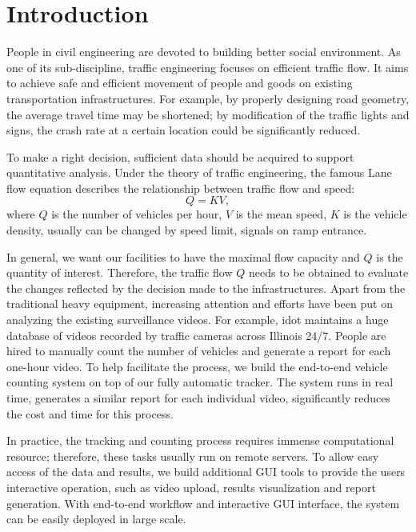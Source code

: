 \section{Introduction}
\label{sec:sys-intro}

People in civil engineering are devoted to building better social environment.
As one of its sub-discipline, traffic engineering focuses on efficient traffic flow. 
It aims to achieve safe and efficient movement of people and goods on existing transportation infrastructures. 
For example, by properly designing road geometry, the average travel time may be shortened; 
by modification of the traffic lights and signs, the crash rate at a certain location could be significantly reduced.

To make a right decision, sufficient data should be acquired to support quantitative analysis.
Under the theory of traffic engineering, the famous Lane flow equation \cite{roess2004traffic} describes the relationship between traffic flow and speed:
$$Q = KV,$$
where $Q$ is the number of vehicles per hour, $V$ is the mean speed, $K$ is the vehicle density, usually can be changed by speed limit, signals on ramp entrance. 

In general, we want our facilities to have the maximal flow capacity and $Q$ is the quantity of interest.
Therefore, the traffic flow $Q$ needs to be obtained to evaluate the changes reflected by the decision made to the infrastructures.
Apart from the traditional heavy equipment, increasing attention and efforts have been put on analyzing the existing surveillance videos.
For example, \gls{idot} maintains a huge database of videos recorded by traffic cameras across Illinois 24/7. 
People are hired to manually count the number of vehicles and generate a report for each one-hour video.
To help facilitate the process, we build the end-to-end vehicle counting system on top of our fully automatic tracker. 
The system runs in real time, generates a similar report for each individual video, significantly reduces the cost and time for this process.

In practice, the tracking and counting process requires immense computational resource; therefore, these tasks usually run on remote servers. 
To allow easy access of the data and results, we build additional GUI tools to provide the users interactive operation, such as video upload, results visualization and report generation.
With end-to-end workflow and interactive GUI interface, the system can be easily deployed in large scale.